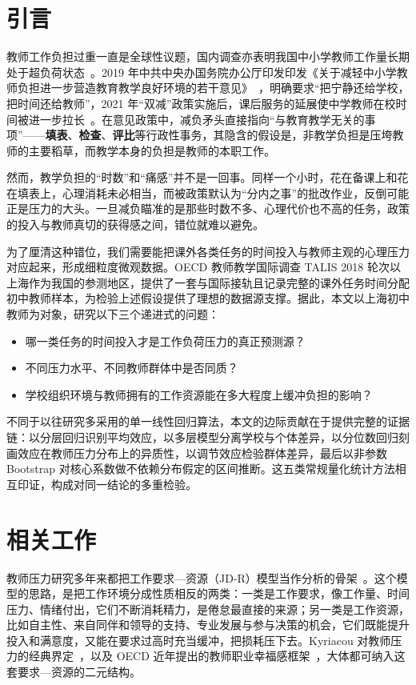 \documentclass[zihao = -4, linespread = 1.5]{article}
\begin{document}
\clearpage
\chead{}
\cfoot{\thepage}
\setcounter{page}{1}



\section{引言}
教师工作负担过重一直是全球性议题，国内调查亦表明我国中小学教师工作量长期处于超负荷状态~\citep{LiXinCui}。2019 年中共中央办国务院办公厅印发印发《关于减轻中小学教师负担进一步营造教育教学良好环境的若干意见》~\citep{Education2019}，明确要求“把宁静还给学校，把时间还给教师”，2021 年“双减”政策实施后，课后服务的延展使中学教师在校时间被进一步拉长~\citep{Education2021}。在意见政策中，减负矛头直接指向“与教育教学无关的事项”——\textbf{填表}、\textbf{检查}、\textbf{评比}等行政性事务，其隐含的假设是，非教学负担是压垮教师的主要稻草，而教学本身的负担是教师的本职工作。

然而，教学负担的“时数”和“痛感”并不是一回事。同样一个小时，花在备课上和花在填表上，心理消耗未必相当，而被政策默认为“分内之事”的批改作业，反倒可能正是压力的大头。一旦减负瞄准的是那些时数不多、心理代价也不高的任务，政策的投入与教师真切的获得感之间，错位就难以避免。

为了厘清这种错位，我们需要能把课外各类任务的时间投入与教师主观的心理压力对应起来，形成细粒度微观数据。OECD 教师教学国际调查 TALIS 2018 轮次以上海作为我国的参测地区，提供了一套与国际接轨且记录完整的课外任务时间分配初中教师样本，为检验上述假设提供了理想的数据源支撑。据此，本文以上海初中教师为对象，研究以下三个递进式的问题：

\begin{itemize}
    \item 哪一类任务的时间投入才是工作负荷压力的真正预测源？
    \item 不同压力水平、不同教师群体中是否同质？
    \item 学校组织环境与教师拥有的工作资源能在多大程度上缓冲负担的影响？
\end{itemize}

不同于以往研究多采用的单一线性回归算法，本文的边际贡献在于提供完整的证据链：以分层回归识别平均效应，以多层模型分离学校与个体差异，以分位数回归刻画效应在教师压力分布上的异质性，以调节效应检验群体差异，最后以非参数 Bootstrap 对核心系数做不依赖分布假定的区间推断。这五类常规量化统计方法相互印证，构成对同一结论的多重检验。



\section{相关工作}
教师压力研究多年来都把工作要求—资源（JD-R）模型当作分析的骨架~\citep{BakkerDemerouti}。这个模型的思路，是把工作环境分成性质相反的两类：一类是工作要求，像工作量、时间压力、情绪付出，它们不断消耗精力，是倦怠最直接的来源；另一类是工作资源，比如自主性、来自同伴和领导的支持、专业发展与参与决策的机会，它们既能提升投入和满意度，又能在要求过高时充当缓冲，把损耗压下去。Kyriacou 对教师压力的经典界定~\citep{Kyriacou}，以及 OECD 近年提出的教师职业幸福感框架~\citep{Viac}，大体都可纳入这套要求—资源的二元结构。
\end{document}
